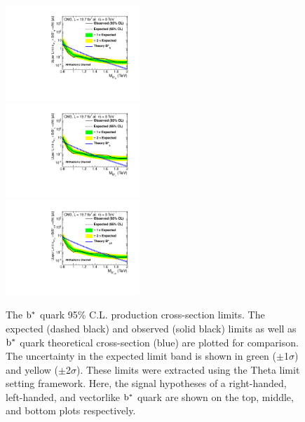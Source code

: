 \begin{figure}[htcb]
\centering
\includegraphics[width=0.45\textwidth]{AN-14-049/figs/limits_theta_had_right_log.pdf}\\
\includegraphics[width=0.45\textwidth]{AN-14-049/figs/limits_theta_had_left_log.pdf}\\
\includegraphics[width=0.45\textwidth]{AN-14-049/figs/limits_theta_had_vector_log.pdf}
\caption{The $\mathrm{b}^{*}$ quark 95\% C.L. production cross-section limits.  The expected (dashed black) and observed (solid black) limits as well as $\mathrm{b}^{*}$ quark 
theoretical cross-section (blue) are plotted for comparison.  
The uncertainty in the expected limit band is shown in green ($\pm$1$\sigma$) and yellow ($\pm$2$\sigma$).
These limits were extracted using the Theta limit setting framework.  Here, the signal hypotheses of a right-handed, left-handed, and vectorlike $\mathrm{b}^{*}$ quark are 
shown on the top, middle, and bottom plots respectively. }
\label{figs:bsthetalimit}
\end{figure}


